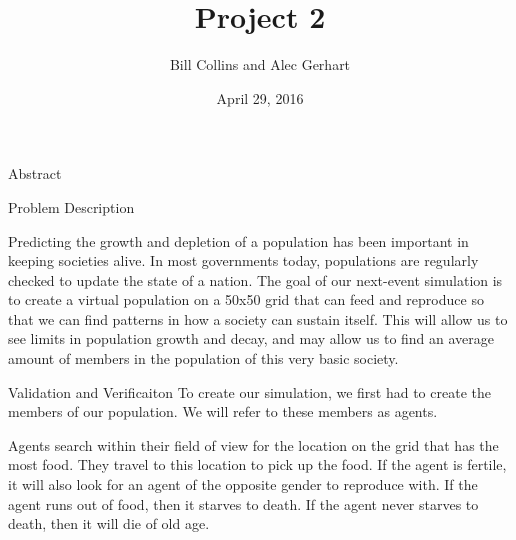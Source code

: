 \documentclass[11pt]{article}
\title{Project 2}
\author{Bill Collins and Alec Gerhart}
\date{April 29, 2016}
\begin{document}
\begin{multicols}{2}

\maketitle


\center 
Abstract
\flushleft



\center 
Problem Description 
\flushleft

Predicting the growth and depletion of a population has been important in keeping societies alive. In most governments today, populations are regularly checked to update the state of a nation. The goal of our next-event simulation is to create a virtual population on a 50x50 grid that can feed and reproduce so that we can find patterns in how a society can sustain itself. This will allow us to see limits in population growth and decay, and may allow us to find an average amount of members in the population of this very basic society.


\center 
Validation and Verificaiton
\flushleft
To create our simulation, we first had to create the members of our population. We will refer to these members as agents.

Agents search within their field of view for the location on the grid that has the most food. They travel to this location to pick up the food. If the agent is fertile, it will also look for an agent of the opposite gender to reproduce with. If the agent runs out of food, then it starves to death. If the agent never starves to death, then it will die of old age. \newline


\end{multicols}
\end{document}
